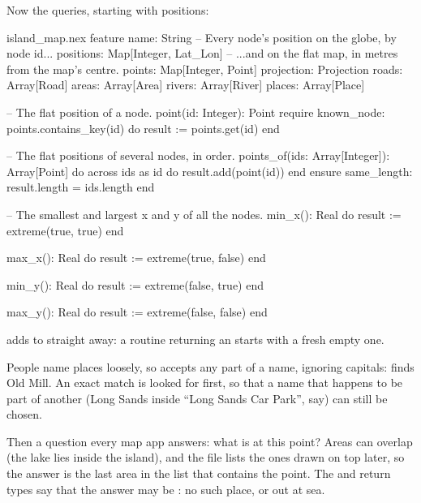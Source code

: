 Now the queries, starting with positions:

\begin{continued}{island_map.nex}
feature
  name: String
  -- Every node's position on the globe, by node id...
  positions: Map[Integer, Lat_Lon]
  -- ...and on the flat map, in metres from the map's centre.
  points: Map[Integer, Point]
  projection: Projection
  roads: Array[Road]
  areas: Array[Area]
  rivers: Array[River]
  places: Array[Place]

  -- The flat position of a node.
  point(id: Integer): Point
  require
    known_node: points.contains_key(id)
  do
    result := points.get(id)
  end

  -- The flat positions of several nodes, in order.
  points_of(ids: Array[Integer]): Array[Point] do
    across ids as id do
      result.add(point(id))
    end
  ensure
    same_length: result.length = ids.length
  end

  -- The smallest and largest x and y of all the nodes.
  min_x(): Real do
    result := extreme(true, true)
  end

  max_x(): Real do
    result := extreme(true, false)
  end

  min_y(): Real do
    result := extreme(false, true)
  end

  max_y(): Real do
    result := extreme(false, false)
  end
\end{continued}

 adds to  straight away: a routine returning
an  starts with a fresh empty one.

People name places loosely, so  accepts any part of a
name, ignoring capitals:  finds Old Mill. An exact match is
looked for first, so that a name that happens to be part of another
(Long Sands inside ``Long Sands Car Park'', say) can still be chosen.

Then a question every map app answers: what is at this point? Areas can
overlap (the lake lies inside the island), and the file lists the ones
drawn on top later, so the answer is the last area in the list that
contains the point. The  and  return types say
that the answer may be : no such place, or out at sea.

